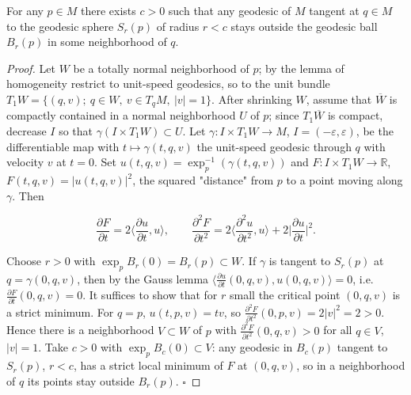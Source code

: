 \begin{lemma}
  \label{lem:dc-ch3-4-1}
  \leanok
  For any $p\in M$ there exists $c>0$ such that any geodesic of $M$ tangent at
  $q\in M$ to the geodesic sphere $S_r(p)$ of radius $r<c$ stays outside the
  geodesic ball $B_r(p)$ in some neighborhood of $q$.
\end{lemma}
\begin{proof}
  \leanok
  Let $W$ be a totally normal neighborhood of $p$; by the lemma of
  homogeneity restrict to unit-speed geodesics, so to the unit bundle
  $T_1W=\{(q,v);\ q\in W,\ v\in T_qM,\ |v|=1\}$. After shrinking $W$, assume that
  $\overline{W}$ is compactly contained in a normal neighborhood $U$ of $p$; since
  $T_1\overline{W}$ is compact, decrease $I$ so that
  $\gamma(I\times T_1W)\subset U$. Let
  $\gamma:I\times T_1W\to M$, $I=(-\varepsilon,\varepsilon)$, be the differentiable
  map with $t\mapsto\gamma(t,q,v)$ the unit-speed geodesic through $q$ with velocity
  $v$ at $t=0$. Set $u(t,q,v)=\exp_p^{-1}(\gamma(t,q,v))$ and
  $F:I\times T_1W\to\mathbb{R}$, $F(t,q,v)=|u(t,q,v)|^2$, the squared "distance"
  from $p$ to a point moving along $\gamma$. Then
  
  $$
  \frac{\partial F}{\partial t}=2\Big\langle\frac{\partial u}{\partial t},u\Big\rangle,\qquad\frac{\partial^2 F}{\partial t^2}=2\Big\langle\frac{\partial^2 u}{\partial t^2},u\Big\rangle+2\Big|\frac{\partial u}{\partial t}\Big|^2.
  $$
  
  Choose $r>0$ with $\exp_p B_r(0)=B_r(p)\subset W$. If $\gamma$ is tangent to
  $S_r(p)$ at $q=\gamma(0,q,v)$, then by the Gauss lemma
  $\langle\frac{\partial u}{\partial t}(0,q,v),u(0,q,v)\rangle=0$, i.e.
  $\frac{\partial F}{\partial t}(0,q,v)=0$. It suffices to show that for $r$ small
  the critical point $(0,q,v)$ is a strict minimum. For $q=p$, $u(t,p,v)=tv$, so
  $\frac{\partial^2 F}{\partial t^2}(0,p,v)=2|v|^2=2>0$. Hence there is a
  neighborhood $V\subset W$ of $p$ with $\frac{\partial^2 F}{\partial t^2}(0,q,v)>0$
  for all $q\in V$, $|v|=1$. Take $c>0$ with $\exp_p B_c(0)\subset V$: any geodesic
  in $B_c(p)$ tangent to $S_r(p)$, $r<c$, has a strict local minimum of $F$ at
  $(0,q,v)$, so in a neighborhood of $q$ its points stay outside $B_r(p)$. $\square$


\end{proof}
